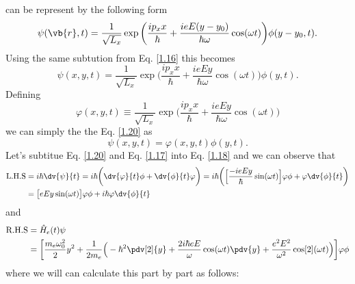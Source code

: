 can be represent by the following form
\begin{equation} \label{1.19}
    \psi(\vb{r},t) = \frac{1}{\sqrt{L_x}} \exp\bigg(
      \frac{ip_x x}{\hbar} +
      \frac{ieE(y-y_0)}{\hbar \omega}\cos(\omega t)
    \bigg) \phi(y-y_0,t).
\end{equation}
Using the same subtution from Eq. \eqref{1.16} this becomes
\begin{equation} \label{1.20}
    \psi(x,y,t) = \frac{1}{\sqrt{L_x}} \exp\bigg(
      \frac{ip_x x}{\hbar} +
      \frac{ieEy}{\hbar \omega}\cos(\omega t)
    \bigg) \phi(y,t).
\end{equation}
Defining
\begin{equation} \label{1.21}
    \varphi(x,y,t) \equiv \frac{1}{\sqrt{L_x}} \exp\bigg(
      \frac{ip_x x}{\hbar} +
      \frac{ieEy}{\hbar \omega}\cos(\omega t)
    \bigg)
\end{equation}
we can simply the the Eq. \eqref{1.20} as
\begin{equation} \label{1.22}
    \psi(x,y,t) = \varphi(x,y,t) \phi(y,t).
\end{equation}
Let's subtitue Eq. \eqref{1.20} and Eq. \eqref{1.17} into Eq. \eqref{1.18} and we can observe that
\begin{equation} \label{1.23}
  \begin{aligned}
    \text{L.H.S} & = i \hbar \dv{\psi}{t} =
    i \hbar \bigg( \dv{\varphi}{t} \phi + \dv{\phi}{t} \varphi \bigg) =
    i \hbar \bigg(
      \Big[\frac{-ieEy}{\hbar}\sin(\omega t)\Big]\varphi\phi +
      \varphi  \dv{\phi}{t}
    \bigg) \\
    & =
    \big[{eEy}\sin(\omega t)\big]\varphi\phi +
    i \hbar\varphi  \dv{\phi}{t}
  \end{aligned}
\end{equation}
and
\begin{equation} \label{1.24}
  \begin{aligned}
    \text{R.H.S} & = \hat{H}_e(t)\psi \\
    & =
    \bigg[
    \frac{m_e \omega_0^2}{2}y^2 +
    \frac{1}{2m_e}\Big(
    -\hbar^2 \pdv[2]{y} +
    \frac{2i\hbar eE}{\omega}\cos(\omega t) \pdv{y}+
    \frac{e^2E^2}{\omega^2}\cos[2](\omega t)
    \Big) \bigg]
    \varphi\phi
  \end{aligned}
\end{equation}
where we will can calculate this part by part as follows:
